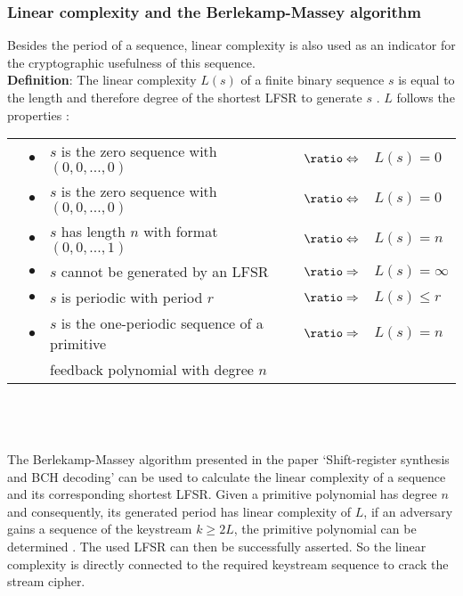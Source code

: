 \clearpage

\subsubsection{Linear complexity and the Berlekamp-Massey algorithm}

Besides the period of a sequence, linear complexity is also used as an indicator for the cryptographic usefulness of this sequence. \\

\textbf{Definition}: The linear complexity $L(s)$ of a finite binary sequence $s$ is equal to the length and therefore degree of the shortest LFSR to generate $s$ \cite[p. 233]{Smart.2016}. $L$ follows the properties \cite[pp. 20-21]{Cusick.2009}:\\

\bgroup
\def\arraystretch{1.2}
\begin{tabular}{lllll}
	&$\bullet$&$s$ is the zero sequence with $(0, 0, ..., 0)$ & $\logeq$ & $L(s)=0$ \\
	&$\bullet$& $s$ is the zero sequence with $(0, 0, ..., 0)$& $\logeq$ & $L(s)=0$   \\
	&$\bullet$& $s$ has length $n$ with format $(0, 0, ..., 1)$ & $\logeq$ & $L(s) = n$\\
	&$\bullet$& $s$ cannot be generated by an LFSR  & $\logright$ & $ L(s) = \infty$\\
	&$\bullet$&  $s$ is periodic with period $r$ & $\logright$ & $L(s) \leq  r$\\
	&$\bullet$& $s$ is the one-periodic sequence of a primitive  & $\logright$ & $L(s) = n$ \\
	&&feedback polynomial with degree $n$&& \\
\end{tabular}
\egroup
\\\\\\
The Berlekamp-Massey algorithm presented in the paper ‘Shift-register synthesis and BCH decoding’ can be used to calculate the linear complexity of a sequence and its corresponding shortest LFSR. Given a primitive polynomial has degree $n$ and consequently, its generated period has linear complexity of $L$, if an adversary gains a sequence of the keystream $k \geq 2L$, the primitive polynomial can be determined \cite[pp. 124-125]{Massey.1969}. The used LFSR can then be successfully asserted. So the linear complexity is directly connected to the required keystream sequence to crack the stream cipher. \\

